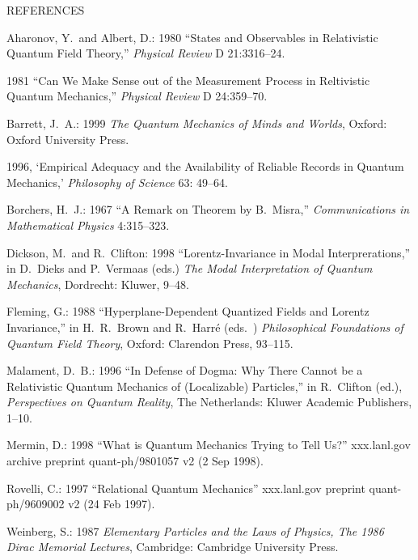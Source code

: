 \documentclass [12pt]{article}
\begin{document}
\newpage
\begin{center}
\Large
REFERENCES
\normalsize
\end{center}
\vspace{.5in}

\vspace{5mm}
\noindent
Aharonov, Y.\ and Albert, D.: 1980 ``States and Observables in Relativistic Quantum
Field Theory,'' {\em Physical Review\/} D 21:3316--24.

\vspace{5mm}
1981 ``Can We Make Sense out of the Measurement Process in Reltivistic Quantum
Mechanics,'' {\em Physical Review\/} D 24:359--70.

\vspace{5mm}
\noindent
Barrett, J.\ A.: 1999 {\em The Quantum Mechanics of Minds and Worlds},
Oxford: Oxford University Press.

\vspace{5mm}
1996, `Empirical Adequacy and the Availability of Reliable
Records in Quantum Mechanics,' {\em Philosophy of Science\/} 63:
49--64.

\vspace{5mm}
\noindent
Borchers, H.\ J.: 1967 ``A Remark on Theorem by B.\ Misra,''  {\em Communications
in Mathematical Physics\/} 4:315--323.

\vspace{5mm}
\noindent
Dickson, M.\ and R.\ Clifton: 1998 ``Lorentz-Invariance in Modal Interprerations,''
in D.\ Dieks and P.\ Vermaas (eds.) {\em The Modal Interpretation of Quantum
Mechanics}, Dordrecht: Kluwer, 9--48.

\vspace{5mm}
\noindent
Fleming, G.: 1988 ``Hyperplane-Dependent Quantized Fields and Lorentz Invariance,''
in H.\ R.\ Brown and R.\ Harr\'e (eds.\ ) {\em Philosophical Foundations of Quantum Field
Theory\/}, Oxford: Clarendon Press, 93--115. 

\vspace{5mm}
\noindent
Malament, D.\ B.: 1996 ``In Defense of Dogma: Why There Cannot be a Relativistic
Quantum Mechanics of (Localizable) Particles,'' in R.\ Clifton (ed.),
{\em Perspectives on Quantum Reality}, The Netherlands: Kluwer Academic Publishers,
1--10.

\vspace{5mm}
\noindent
Mermin, D.: 1998 ``What is Quantum Mechanics Trying to Tell Us?'' xxx.lanl.gov archive
preprint quant-ph/9801057 v2 (2 Sep 1998). 

\vspace{5mm}
\noindent
Rovelli, C.: 1997 ``Relational Quantum Mechanics'' xxx.lanl.gov preprint
quant-ph/9609002 v2 (24 Feb 1997).


\vspace{5mm}
\noindent
Weinberg, S.: 1987 {\em Elementary Particles and the Laws of Physics, The 1986
Dirac Memorial Lectures}, Cambridge: Cambridge University Press.
\end{document}
